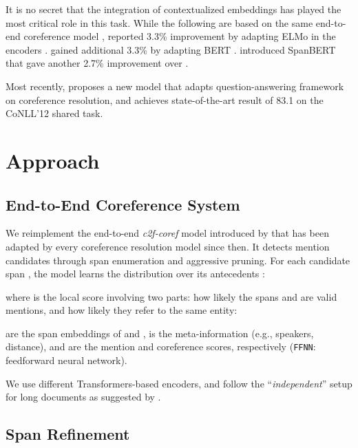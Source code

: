 \documentclass[11pt,a4paper]{article}
\begin{document}
It is no secret that the integration of contextualized embeddings has played the most critical role in this task. While the following are based on the same end-to-end coreference model \cite{lee-etal-2017-end},
\citet{lee-etal-2018-higher,fei-etal-2019-end} reported 3.3\% improvement by adapting ELMo in the encoders \cite{peters-etal-2018-deep}.
\citet{kantor-globerson-2019-coreference,joshi-etal-2019-bert} gained additional 3.3\% by adapting BERT \cite{devlin-etal-2019-bert}.
\citet{spanbert-joshi} introduced SpanBERT that gave another 2.7\% improvement over \citet{joshi-etal-2019-bert}.

Most recently, \citet{wu-etal-2020-corefqa} proposes a new model that adapts question-answering framework on coreference resolution, and achieves state-of-the-art result of 83.1 on the CoNLL'12 shared task.




 \section{Approach}
\label{sec:approach}




\subsection{End-to-End Coreference System}
\label{subsec:baseline}

We reimplement the end-to-end \textit{c2f-coref} model introduced by \citet{lee-etal-2018-higher} that has been adapted by every coreference resolution model since then. It detects mention candidates through span enumeration and aggressive pruning.
For each candidate span , the model learns the distribution over its antecedents :

where  is the local score involving two parts: how likely the spans  and  are valid mentions, and how likely they refer to the same entity:

 are the span embeddings of  and ,  is the meta-information (e.g., speakers, distance), and  are the mention and coreference scores, respectively (\texttt{FFNN}: feedforward neural network).

We use different Transformers-based encoders, and follow the ``\textit{independent}'' setup for long documents as suggested by \citet{joshi-etal-2019-bert}.







\subsection{Span Refinement}
\label{subsec:previous}
\end{document}
